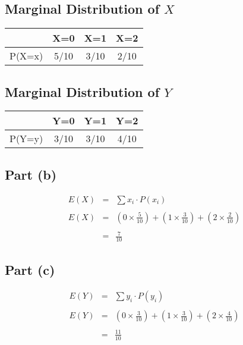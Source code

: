\documentclass[a4paper,12pt]{article}
\begin{document}
\subsection*{Marginal Distribution of $X$}
\begin{center}
	\begin{tabular}{|c|c|c|c|}\hline 
		\phantom{spa} \phantom{spa} & \phantom{spa} X=0  \phantom{spa} & \phantom{spa} X=1\phantom{spa}   & \phantom{spa} X=2\phantom{spa}  \\ \hline  

		P(X=x) & 5/10 & 3/10 & 2/10 \\ \hline	
	\end{tabular} 
\end{center}

\subsection*{Marginal Distribution of $Y$}
\begin{center}
	\begin{tabular}{|c|c|c|c|}\hline
		\phantom{spa} \phantom{spa} & \phantom{spa} Y=0  \phantom{spa} & \phantom{spa} Y=1\phantom{spa}   & \phantom{spa} Y=2\phantom{spa}  \\ \hline 
		P(Y=y) & 3/10 & 3/10 & 4/10 \\ \hline	
	\end{tabular} 
\end{center}

\newpage


\subsection*{Part (b)}

\begin{eqnarray*}
E(X) &=& \sum x_i \cdot P(x_i)\\
& & \\
E(X) &=& \left( 0 \times \frac{5}{10} \right) + \left( 1 \times \frac{3}{10} \right) + \left( 2 \times \frac{2}{10} \right)\\
& & \\
&=&  \frac{7}{10}
\end{eqnarray*}

\subsection*{Part (c)}

\begin{eqnarray*}
E(Y) &=& \sum y_i \cdot P(y_i)\\
& & \\
E(Y) &=& \left( 0 \times \frac{3}{10} \right) + \left( 1 \times \frac{3}{10} \right) + \left( 2 \times \frac{4}{10} \right)\\
& & \\
&=&  \frac{11}{10}
\end{eqnarray*}
\end{document}
